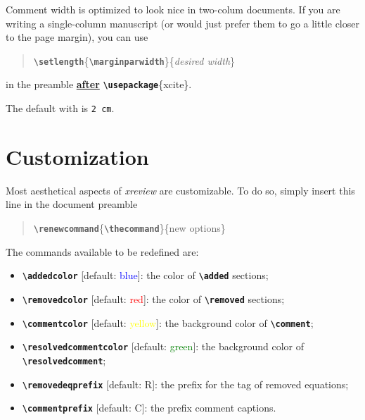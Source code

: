 \documentclass[a4paper]{ltxdoc}
\newcommand{\writecommand}[1]{\texttt{\textbf{{\textbackslash#1}}}}
\newcommand{\writearg}[1]{\{#1\}}
\begin{document}
Comment width is optimized to look nice in two-colum documents. If you are writing a single-column manuscript (or would just prefer them to go a little closer to the page margin), you can use 
\begin{quote}
    \writecommand{setlength}\writearg{\writecommand{marginparwidth}}\writearg{\textit{desired width}}
\end{quote}
in the preamble \underline{\textbf{after}} \writecommand{usepackage}\writearg{xcite}.

The default with is \texttt{2 cm}.

\section{Customization}
\label{sec:custom}

Most aesthetical aspects of \textit{xreview} are customizable. To do so, simply insert this line in the document preamble
\begin{quote}
    \writecommand{renewcommand}\{\writecommand{thecommand}\}\writearg{new options}
\end{quote}

The commands available to be redefined are:
\begin{itemize}
    \item \writecommand{addedcolor} [default: \textcolor{blue}{blue}]: the color of \writecommand{added} sections;
    \item \writecommand{removedcolor} [default: \textcolor{red}{red}]: the color of \writecommand{removed} sections;
    \item \writecommand{commentcolor} [default: \textcolor{yellow}{yellow}]: the background color of \writecommand{comment};
    \item \writecommand{resolvedcommentcolor} [default: \textcolor{green}{green}]: the background color of \writecommand{resolvedcomment};
    \item \writecommand{removedeqprefix} [default: R]: the prefix for the tag of removed equations;
    \item \writecommand{commentprefix} [default: C]: the prefix comment captions.
\end{itemize}




\end{document}
